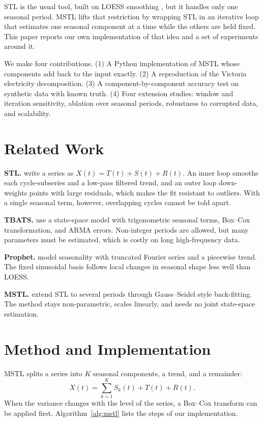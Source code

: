 \documentclass[10pt,twocolumn]{article}
\begin{document}
STL \citep{cleveland1990} is the usual tool, built on LOESS smoothing \citep{cleveland1979}, but it handles only one seasonal period. MSTL \citep{bandara2021} lifts that restriction by wrapping STL in an iterative loop that estimates one seasonal component at a time while the others are held fixed. This paper reports our own implementation of that idea and a set of experiments around it.

We make four contributions. (1) A Python implementation of MSTL whose components add back to the input exactly. (2) A reproduction of the Victoria electricity decomposition. (3) A component-by-component accuracy test on synthetic data with known truth. (4) Four extension studies: window and iteration sensitivity, ablation over seasonal periods, robustness to corrupted data, and scalability.

\section{Related Work}
\textbf{STL.} \citet{cleveland1990} write a series as $X(t)=T(t)+S(t)+R(t)$. An inner loop smooths each cycle-subseries and a low-pass filtered trend, and an outer loop down-weights points with large residuals, which makes the fit resistant to outliers. With a single seasonal term, however, overlapping cycles cannot be told apart.

\textbf{TBATS.} \citet{delivera2011} use a state-space model with trigonometric seasonal terms, Box--Cox transformation, and ARMA errors. Non-integer periods are allowed, but many parameters must be estimated, which is costly on long high-frequency data.

\textbf{Prophet.} \citet{taylor2018} model seasonality with truncated Fourier series and a piecewise trend. The fixed sinusoidal basis follows local changes in seasonal shape less well than LOESS.

\textbf{MSTL.} \citet{bandara2021} extend STL to several periods through Gauss--Seidel style back-fitting. The method stays non-parametric, scales linearly, and needs no joint state-space estimation.

\section{Method and Implementation}
MSTL splits a series into $K$ seasonal components, a trend, and a remainder:
\begin{equation}
X(t)=\sum_{k=1}^{K}S_k(t)+T(t)+R(t).
\end{equation}
When the variance changes with the level of the series, a Box--Cox transform \citep{box1964} can be applied first. Algorithm~\ref{alg:mstl} lists the steps of our implementation.
\end{document}
